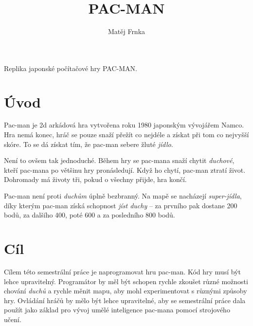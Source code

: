 \documentclass[czech]{pyt-report}
\title{PAC-MAN}
\author{Matěj Frnka}
\affiliation{ČVUT--FIT}
\begin{document}
\maketitle

Replika japonské počítačové hry PAC-MAN.

\section{Úvod}


Pac-man je 2d arkádová hra vytvořena roku 1980 japonským vývojářem Namco. Hra nemá konec, hráč se pouze snaží přežít co nejdéle a získat při tom co nejvyšší skóre. To se dá získat tím, že pac-man sebere žluté \textit{jídlo}.\par
Není to ovšem tak jednoduché. Během hry se pac-mana snaží chytit \textit{duchové}, kteří pac-mana po většinu hry pronásledují. Když ho chytí, pac-man ztratí život. Dohromady má životy tři, pokud o všechny přijde, hra končí.\par
Pac-man není proti \textit{duchům} úplně bezbranný. Na mapě se nacházejí \textit{super-jídla}, díky kterým pac-man získá schopnost \textit{jíst duchy} – za prvního pak dostane 200 bodů, za dalšího 400, poté 600 a za posledního 800 bodů.
\section{Cíl}
Cílem této semestrální práce je naprogramovat hru pac-man. Kód hry musí být lehce upravitelný. Programátor by měl být schopen rychle zkoušet různé možnosti chování \textit{duchů} a rychle měnit mapu, aby mohl experimentovat s různými způsoby hry. Ovládání hráčů by mělo být lehce upravitelné, aby se semestrální práce dala použít jako základ pro vývoj umělé inteligence pac-mana pomocí strojového učení.


\end{document}
